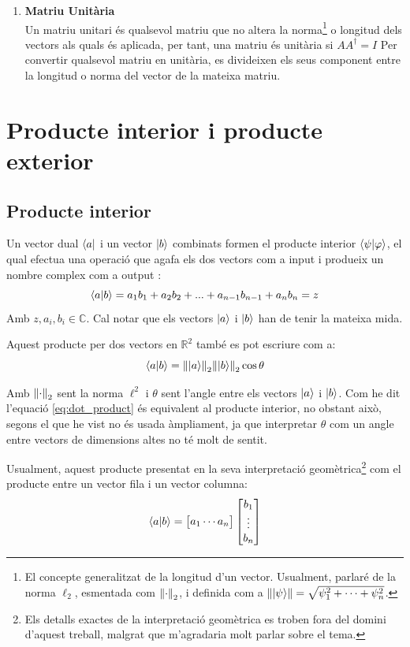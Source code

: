 \begin{enumerate}
	\item \textbf{Matriu Unitària} \\
	Un matriu unitari és qualsevol matriu que no altera la norma\footnote{El concepte generalitzat de la longitud d'un vector. Usualment, parlaré de la norma $\ell_2$, esmentada com $\norm{\cdot}_2$, i definida com a $\norm{\ket{\psi}} = \sqrt{\psi^2_1 + \cdots + \psi^2_n}$.} o longitud dels vectors als quals és aplicada, per tant, una matriu és unitària si $AA^\dagger = I$
	Per convertir qualsevol matriu en unitària, es divideixen els seus component entre la longitud o norma del vector de la mateixa matriu.
	
\end{enumerate}

\section{Producte interior i producte exterior}

\subsection{Producte interior}
Un vector dual $\bra{a}$ i un vector $\ket{b}$ combinats formen el producte interior $\bra{\psi}\ket{\varphi}$, el qual efectua una operació que agafa els dos vectors com a input i produeix un nombre complex com a output \cite{QCandQI:inner}:
$$
\bra{a}\ket{b} = a_1 b_1 + a_2 b_2 + ... + a_{n-1} b_{n-1} + a_n b_n = z
$$
Amb $z, a_i, b_i \in \mathbb{C}$. Cal notar que els vectors $\ket{a}$ i $\ket{b}$ han de tenir la mateixa mida. 

Aquest producte per dos vectors en $\mathbb{R}^2$ també es pot escriure com a:
\begin{equation}
	\bra{a}\ket{b} = \norm{\ket{a}}_2  \norm{\ket{b}}_2 \cos \theta 
	\label{eq:dot_product}
\end{equation}


Amb $\norm{\cdot}_2$ sent la norma $\ell^2$ i $\theta$ sent l'angle entre els vectors $\ket{a}$ i $\ket{b}$. Com he dit l'equació \eqref{eq:dot_product} és equivalent al producte interior, no obstant això, segons el que he vist no és usada àmpliament, ja que interpretar $\theta$ com un angle entre vectors de dimensions altes no té molt de sentit. 

Usualment, aquest producte presentat en la seva interpretació geomètrica\footnote{Els detalls exactes de la interpretació geomètrica es troben fora del domini d'aquest treball, malgrat que m'agradaria molt parlar sobre el tema.} com el producte entre un vector fila i un vector columna:
$$
\bra{a}\ket{b} = \begin{bmatrix}a_1  \cdots  a_n \end{bmatrix} \begin{bmatrix} b_{1} \\ \vdots \\ b_{n} \end{bmatrix}
$$


